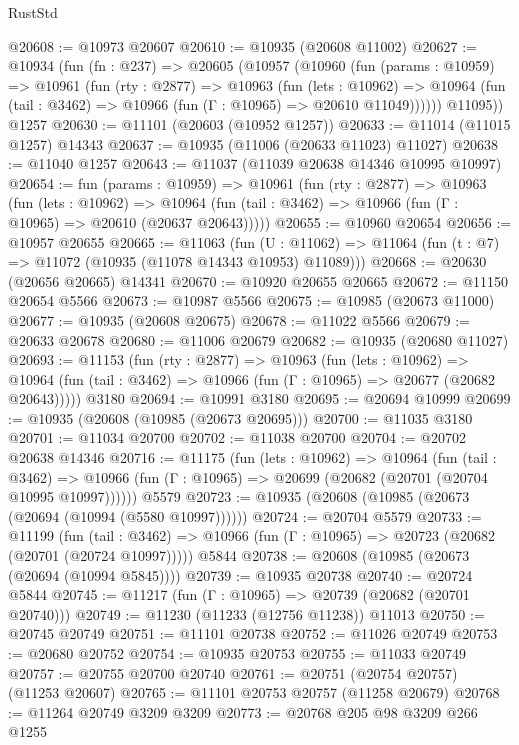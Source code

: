 \begin{lexlean}{RustStd}
\begin{coremodule}
{\begin{coremodule}
{{{{{{{{{{{{{{{{{{{{{{{{{{{{{{{{{{{{{{{{{{{{{{{{{{{{{{{{{{{{{{{{{{{{{{{{{{{{{{{{{{{{{@20608 := @10973 @20607
@20610 := @10935 (@20608 @11002)
@20627 := @10934
    (fun (fn : @237) =>
    @20605
      (@10957
        (@10960
          (fun (params : @10959) =>
          @10961
            (fun (rty : @2877) =>
            @10963
              (fun (lets : @10962) =>
              @10964 (fun (tail : @3462) => @10966 (fun (Γ : @10965) => @20610 @11049))))))
        @11095))
    @1257
@20630 := @11101 (@20603 (@10952 @1257))
@20633 := @11014 (@11015 @1257) @14343
@20637 := @10935 (@11006 (@20633 @11023) @11027)
@20638 := @11040 @1257
@20643 := @11037 (@11039 @20638 @14346 @10995 @10997)
@20654 := fun (params : @10959) =>
  @10961
    (fun (rty : @2877) =>
    @10963
      (fun (lets : @10962) =>
      @10964 (fun (tail : @3462) => @10966 (fun (Γ : @10965) => @20610 (@20637 @20643)))))
@20655 := @10960 @20654
@20656 := @10957 @20655
@20665 := @11063
    (fun (U : @11062) => @11064 (fun (t : @7) => @11072 (@10935 (@11078 @14343 @10953) @11089)))
@20668 := @20630 (@20656 @20665) @14341
@20670 := @10920 @20655 @20665
@20672 := @11150 @20654 @5566
@20673 := @10987 @5566
@20675 := @10985 (@20673 @11000)
@20677 := @10935 (@20608 @20675)
@20678 := @11022 @5566
@20679 := @20633 @20678
@20680 := @11006 @20679
@20682 := @10935 (@20680 @11027)
@20693 := @11153
    (fun (rty : @2877) =>
    @10963
      (fun (lets : @10962) =>
      @10964 (fun (tail : @3462) => @10966 (fun (Γ : @10965) => @20677 (@20682 @20643)))))
    @3180
@20694 := @10991 @3180
@20695 := @20694 @10999
@20699 := @10935 (@20608 (@10985 (@20673 @20695)))
@20700 := @11035 @3180
@20701 := @11034 @20700
@20702 := @11038 @20700
@20704 := @20702 @20638 @14346
@20716 := @11175
    (fun (lets : @10962) =>
    @10964
      (fun (tail : @3462) =>
      @10966 (fun (Γ : @10965) => @20699 (@20682 (@20701 (@20704 @10995 @10997))))))
    @5579
@20723 := @10935 (@20608 (@10985 (@20673 (@20694 (@10994 (@5580 @10997))))))
@20724 := @20704 @5579
@20733 := @11199
    (fun (tail : @3462) => @10966 (fun (Γ : @10965) => @20723 (@20682 (@20701 (@20724 @10997)))))
    @5844
@20738 := @20608 (@10985 (@20673 (@20694 (@10994 @5845))))
@20739 := @10935 @20738
@20740 := @20724 @5844
@20745 := @11217 (fun (Γ : @10965) => @20739 (@20682 (@20701 @20740)))
@20749 := @11230 (@11233 (@12756 @11238)) @11013
@20750 := @20745 @20749
@20751 := @11101 @20738
@20752 := @11026 @20749
@20753 := @20680 @20752
@20754 := @10935 @20753
@20755 := @11033 @20749
@20757 := @20755 @20700 @20740
@20761 := @20751 (@20754 @20757) (@11253 @20607)
@20765 := @11101 @20753 @20757 (@11258 @20679)
@20768 := @11264 @20749 @3209 @3209
@20773 := @20768 @205 @98 @3209 @266 @1255
}}}}}}}}}}}}}}}}}}}}}}}}}}}}}}}}}}}}}}}}}}}}}}}}}}}}}}}}}}}}}}}}}}}}}}}}}}}}}}}}}}}}}
\end{coremodule}}
\end{coremodule}
\end{lexlean}
